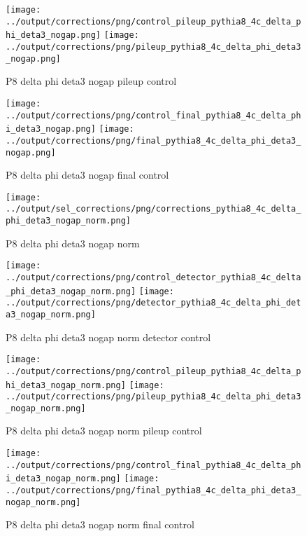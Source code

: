 \documentclass[11pt]{book}
\begin{document}
\begin{figure}[ht]
\centering
\texttt{[image: ../output/corrections/png/control\_pileup\_pythia8\_4c\_delta\_phi\_deta3\_nogap.png]}
\texttt{[image: ../output/corrections/png/pileup\_pythia8\_4c\_delta\_phi\_deta3\_nogap.png]}
\caption{P8 delta phi deta3 nogap pileup control}
\label{fig:p8_delta_phi_deta3_nogap_pileup_control}
\end{figure}


\begin{figure}[ht]
\centering
\texttt{[image: ../output/corrections/png/control\_final\_pythia8\_4c\_delta\_phi\_deta3\_nogap.png]}
\texttt{[image: ../output/corrections/png/final\_pythia8\_4c\_delta\_phi\_deta3\_nogap.png]}
\caption{P8 delta phi deta3 nogap final control}
\label{fig:p8_delta_phi_deta3_nogap_final_control}
\end{figure}

\begin{figure}[ht]
\centering
\texttt{[image: ../output/sel\_corrections/png/corrections\_pythia8\_4c\_delta\_phi\_deta3\_nogap\_norm.png]}
\caption{P8 delta phi deta3 nogap norm}
\label{fig:p8_delta_phi_deta3_nogap_norm}
\end{figure}


\begin{figure}[ht]
\centering
\texttt{[image: ../output/corrections/png/control\_detector\_pythia8\_4c\_delta\_phi\_deta3\_nogap\_norm.png]}
\texttt{[image: ../output/corrections/png/detector\_pythia8\_4c\_delta\_phi\_deta3\_nogap\_norm.png]}
\caption{P8 delta phi deta3 nogap norm detector control}
\label{fig:p8_delta_phi_deta3_nogap_norm_detector_control}
\end{figure}

\begin{figure}[ht]
\centering
\texttt{[image: ../output/corrections/png/control\_pileup\_pythia8\_4c\_delta\_phi\_deta3\_nogap\_norm.png]}
\texttt{[image: ../output/corrections/png/pileup\_pythia8\_4c\_delta\_phi\_deta3\_nogap\_norm.png]}
\caption{P8 delta phi deta3 nogap norm pileup control}
\label{fig:p8_delta_phi_deta3_nogap_norm_pileup_control}
\end{figure}


\begin{figure}[ht]
\centering
\texttt{[image: ../output/corrections/png/control\_final\_pythia8\_4c\_delta\_phi\_deta3\_nogap\_norm.png]}
\texttt{[image: ../output/corrections/png/final\_pythia8\_4c\_delta\_phi\_deta3\_nogap\_norm.png]}
\caption{P8 delta phi deta3 nogap norm final control}
\label{fig:p8_delta_phi_deta3_nogap_norm_final_control}
\end{figure}
\end{document}

